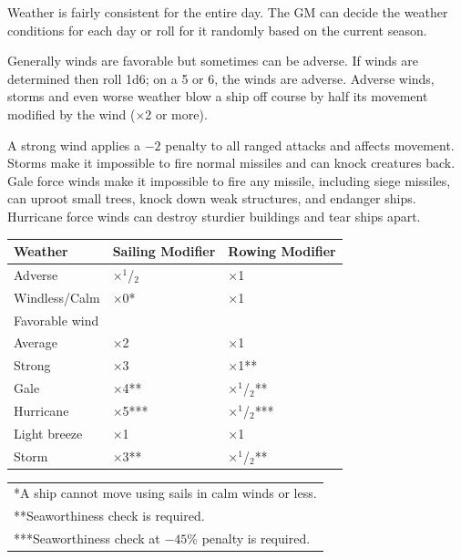 \begin{multicols}{2}
Weather is fairly consistent for the entire day.  The GM can decide the weather conditions for each day or roll for it randomly based on the current season.

Generally winds are favorable but sometimes can be adverse.  If winds are determined then roll 1d6; on a 5 or 6, the winds are adverse.  Adverse winds, storms and even worse weather blow a ship off course by half its movement modified by the wind ($\times$2 or more).

A strong wind applies a $-2$ penalty to all ranged attacks and affects movement.  Storms make it impossible to fire normal missiles and can knock creatures back.  Gale force winds make it impossible to fire any missile, including siege missiles, can uproot small trees, knock down weak structures, and endanger ships.  Hurricane force winds can destroy sturdier buildings and tear ships apart.

\noindent
\begin{minipage}{\columnwidth}

\label{weathershipmods}
\noindent
\begin{tabular}{|p{}|p{}|p{}|}
\hline
Weather			& Sailing Modifier	& Rowing Modifier \\
\hline\hline
\rowcolor[gray]{.9}Adverse			& $\times$$^1$/$_2$		& $\times$1 \\
Windless/Calm	& $\times$0*		& $\times$1 \\
\rowcolor[gray]{.9}Favorable wind	& 			&  \\
\rowcolor[gray]{.9}\hspace{2em}Average		& $\times$2		& $\times$1 \\
\hspace{2em}Strong		& $\times$3		& $\times$1** \\
\rowcolor[gray]{.9}Gale			& $\times$4**		& $\times$$^1$/$_2$** \\
Hurricane		& $\times$5***	& $\times$$^1$/$_2$*** \\
\rowcolor[gray]{.9}Light breeze	& $\times$1		& $\times$1 \\
Storm			& $\times$3**		& $\times$$^1$/$_2$** \\
\hline
\end{tabular}
\noindent\begin{tabular}{p{}}
*A ship cannot move using sails in calm winds or less. \\
**Seaworthiness check is required. \\
***Seaworthiness check at $-45$\% penalty is required. \\
\end{tabular}\vspace{.5em}


\end{minipage}
\end{multicols}
